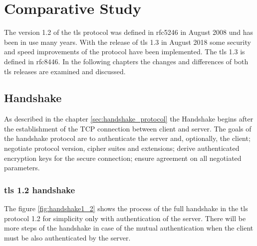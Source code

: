 \chapter{Comparative Study}
\label{chap:comparative_study}

The version 1.2 of the \gls{tls} protocol was defined in \gls{rfc}5246 in August 2008 und has been in use many years. With the release of \gls{tls} 1.3 in August 2018 some security and speed improvements of the protocol have been implemented. The \gls{tls} 1.3 is defined in \gls{rfc}8446. In the following chapters the changes and differences of both \gls{tls} releases are examined and discussed.

\section{Handshake}
\label{sec:comparison_handshake}

As described in the chapter \ref{sec:handshake_protocol} the Handshake begins after the establishment of the TCP connection between client and server. The goals of the handshake protocol are to authenticate the server and, optionally, the client; negotiate protocol version, cipher suites and extensions; derive authenticated encryption keys for the secure connection; ensure agreement on all negotiated parameters. \cite{Hassenstein}

\subsection{\gls{tls} 1.2 handshake}
\label{subsec:handshake1_2}

The figure \ref{fig:handshake1_2} shows the process of the full handshake in the \gls{tls} protocol 1.2 for simplicity only with authentication of the server. There will be more steps of the handshake in case of the mutual authentication when the client must be also authenticated by the server.

